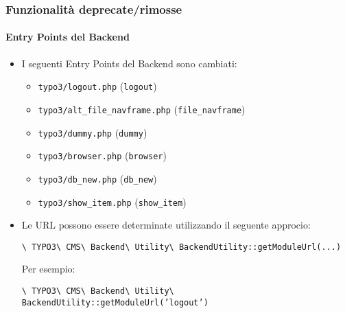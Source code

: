 \begin{frame}[fragile]
	\frametitle{Funzionalità deprecate/rimosse}
	\framesubtitle{Entry Points del Backend}

	\begin{itemize}

		\item I seguenti Entry Points del Backend sono cambiati:

			\begin{itemize}
				\item \texttt{typo3/logout.php}					\tabto{6cm}(\begingroup\color{typo3orange}\texttt{logout}\endgroup)
				\item \texttt{typo3/alt\_file\_navframe.php}	\tabto{6cm}(\begingroup\color{typo3orange}\texttt{file\_navframe}\endgroup)
				\item \texttt{typo3/dummy.php}					\tabto{6cm}(\begingroup\color{typo3orange}\texttt{dummy}\endgroup)
				\item \texttt{typo3/browser.php}				\tabto{6cm}(\begingroup\color{typo3orange}\texttt{browser}\endgroup)
				\item \texttt{typo3/db\_new.php}				\tabto{6cm}(\begingroup\color{typo3orange}\texttt{db\_new}\endgroup)
				\item \texttt{typo3/show\_item.php}				\tabto{6cm}(\begingroup\color{typo3orange}\texttt{show\_item}\endgroup)
			\end{itemize}

		\item Le URL possono essere determinate utilizzando il seguente approcio:

			\smaller
				\texttt{\textbackslash
					TYPO3\textbackslash
					CMS\textbackslash
					Backend\textbackslash
					Utility\textbackslash
					BackendUtility::getModuleUrl(...)}
			\normalsize

			Per esempio:

			\smaller
				\texttt{\textbackslash
					TYPO3\textbackslash
					CMS\textbackslash
					Backend\textbackslash
					Utility\textbackslash
					BackendUtility::getModuleUrl('}\begingroup\color{typo3orange}\texttt{logout}\endgroup\texttt{')}
			\normalsize

	\end{itemize}

\end{frame}


